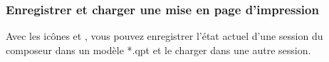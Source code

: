 \subsubsection{Enregistrer et charger une mise en page d'impression}

Avec les icônes  et , vous pouvez enregistrer l'état actuel d'une session du composeur dans un modèle *.qpt et le charger dans une autre session.
